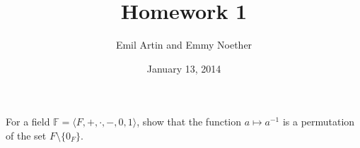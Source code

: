 
         \newcommand\alg[1]{\ensuremath{\mathbf{#1}}}
         \newcommand{\<}{\ensuremath{\langle}}
         \renewcommand{\>}{\ensuremath{\rangle}}
         \newcommand\fld[1]{\ensuremath{\mathbb{#1}}}

         \author{Emil Artin and Emmy Noether}
         \title{Homework 1}
         \date{January 13, 2014}



\maketitle


\begin{problem}[Golan 12]
For a field $\fld{F} = \<F,+,\cdot, -, 0, 1\>$, 
show that the function $a \mapsto a^{-1}$ is a 
permutation of the set $F \setminus \{0_F\}$.
\end{problem}
\smallskip
\begin{solution}


\end{solution}
\probskip




